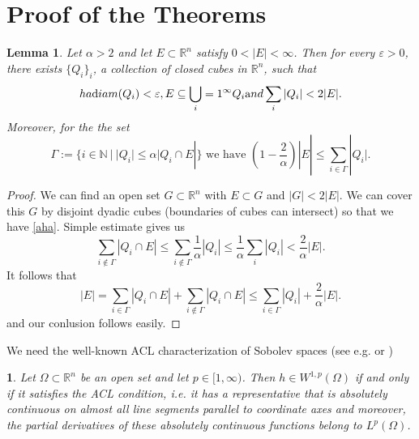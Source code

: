 \documentclass[12pt,a4paper]{amsart}
\theoremstyle{plain}
\newtheorem{lemma}[thm]{Lemma}
\newtheorem{proclaim}[thm]{\the\prt}
\theoremstyle{definition}
\def\eqn#1$$#2$${\begin{equation}\label#1#2\end{equation}}
\numberwithin{equation}{section}
\def\oint{-\hskip -11pt \int}
\def\rn{\mathbb R^n}
\newcommand{\RR}{\mathbb{R}}
\newcommand{\NN}{\mathbb{N}}
\begin{document}
\bigskip
 \section{Proof of the Theorems}


    \begin{lemma}\label{lm-covering}
  Let $\alpha>2$ and let $E\subset \RR^n$ satisfy $0<|E|<\infty$. Then for every $\varepsilon>0$, there exists $\{Q_i\}_i$, a collection of closed cubes in $\RR^n$, such that
	\eqn{aha}
  $$
  \text{diam}(Q_i) <\varepsilon, E\subseteq \bigcup_{i=1}^\infty Q_i \text{ and }\sum_i|Q_i|< 2|E|. 
  $$
	Moreover, for the the set
	$$
  \Gamma:=\bigl\{i\in \NN\ |\ |Q_i|\leq \alpha |Q_i\cap E| \bigr\}\text{ we have }(1-\frac{2}{\alpha}) |E|\leq \sum_{i\in\Gamma} |Q_i|.
   $$
\end{lemma}
\begin{proof}
We can find an open set $G\subset\rn$ with $E\subset G$ and $|G|< 2|E|$. We can cover this $G$ by disjoint dyadic cubes (boundaries of cubes can intersect) so that we have \eqref{aha}. Simple estimate gives us
$$
\sum_{i\notin \Gamma}|Q_i\cap E|\leq \sum_{i\notin \Gamma}\frac{1}{\alpha}|Q_i|\leq \frac{1}{\alpha}\sum_{i}|Q_i|<\frac{2}{\alpha} |E|. 
$$
It follows that 
$$
|E|= \sum_{i\in \Gamma}|Q_i\cap E|+\sum_{i\notin \Gamma}|Q_i\cap E|\leq \sum_{i\in \Gamma}|Q_i|+\frac{2}{\alpha}|E|. 
$$
and our conlusion follows easily. 
\end{proof}

We need the well-known ACL characterization of Sobolev spaces (see e.g. \cite[Chapter~4.9]{EG} or \cite[Theorem A.15]{HK})

\begin{proclaim}\label{ACL}
Let $\Omega\subset \rn $ be an open set and let $p\in [1,\infty)$. Then $h\in W^{1,p}(\Omega)$ if and only if it satisfies the ACL condition, i.e. it has a representative that is absolutely continuous on almost all line segments parallel to coordinate axes and moreover, the partial derivatives of these absolutely continuous functions belong to $L^{p}(\Omega)$.   
\end{proclaim}
\end{document}
